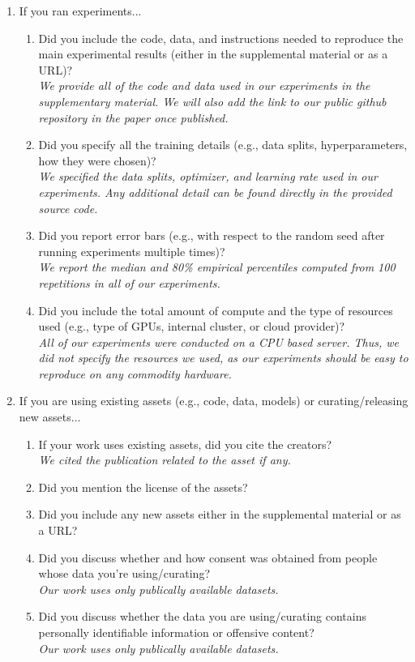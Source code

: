 \begin{enumerate}
\item If you ran experiments...
\begin{enumerate}
  \item Did you include the code, data, and instructions needed to reproduce the main experimental results (either in the supplemental material or as a URL)?
    \answerYes{} \\
    \textit{We provide all of the code and data used in our experiments in the supplementary material.
    We will also add the link to our public github repository in the paper once published.}
  \item Did you specify all the training details (e.g., data splits, hyperparameters, how they were chosen)?
    \answerYes{} \\
    \textit{We specified the data splits, optimizer, and learning rate used in our experiments.
    Any additional detail can be found directly in the provided source code.}
  \item Did you report error bars (e.g., with respect to the random seed after running experiments multiple times)?
    \answerYes{} \\
    \textit{We report the median and 80\% empirical percentiles computed from 100 repetitions in all of our experiments.}
     \item Did you include the total amount of compute and the type of resources used (e.g., type of GPUs, internal cluster, or cloud provider)? 
     \answerNo{} \\
     \textit{
      All of our experiments were conducted on a CPU based server.
      Thus, we did not specify the resources we used, as our experiments should be easy to reproduce on any commodity hardware.
     }
\end{enumerate}

\item If you are using existing assets (e.g., code, data, models) or curating/releasing new assets...
\begin{enumerate}
  \item If your work uses existing assets, did you cite the creators?
    \answerYes{} \\
    \textit{We cited the publication related to the asset if any.}
  \item Did you mention the license of the assets?
    \answerTODO{}
  \item Did you include any new assets either in the supplemental material or as a URL?
    \answerNo{}
  \item Did you discuss whether and how consent was obtained from people whose data you're using/curating?
    \answerNA{} \\
    \textit{Our work uses only publically available datasets.}
  \item Did you discuss whether the data you are using/curating contains personally identifiable information or offensive content?
    \answerNA{} \\
    \textit{Our work uses only publically available datasets.}
\end{enumerate}


\end{enumerate}
